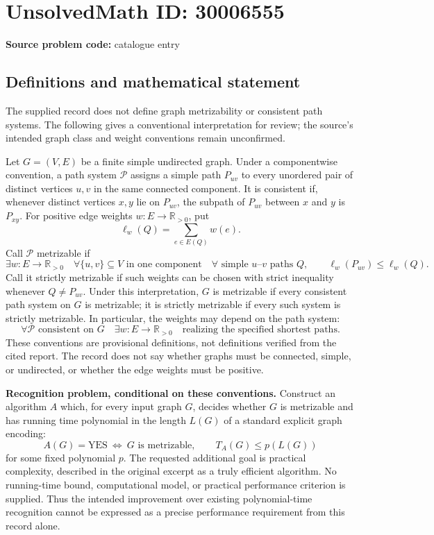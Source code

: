 \documentclass[11pt]{article}
\newcommand{\R}{\mathbb{R}}
\begin{document}
\section*{UnsolvedMath ID: 30006555}
\textbf{Source problem code:} catalogue entry
\subsection{Definitions and mathematical statement}
The supplied record does not define graph metrizability or consistent path systems. The following gives a conventional interpretation for review; the source's intended graph class and weight conventions remain unconfirmed.

Let \(G=(V,E)\) be a finite simple undirected graph. Under a componentwise convention, a path system \(\mathcal P\) assigns a simple path \(P_{uv}\) to every unordered pair of distinct vertices \(u,v\) in the same connected component. It is consistent if, whenever distinct vertices \(x,y\) lie on \(P_{uv}\), the subpath of \(P_{uv}\) between \(x\) and \(y\) is \(P_{xy}\). For positive edge weights \(w:E\to\R_{>0}\), put
\[
\ell_w(Q)=\sum_{e\in E(Q)}w(e).
\]
Call \(\mathcal P\) metrizable if
\[
\exists w:E\to\R_{>0}\quad
\forall \{u,v\}\subseteq V\text{ in one component}\quad
\forall\text{ simple }u\text{--}v\text{ paths }Q,
\qquad \ell_w(P_{uv})\leq\ell_w(Q).
\]
Call it strictly metrizable if such weights can be chosen with strict inequality whenever \(Q\ne P_{uv}\). Under this interpretation, \(G\) is metrizable if every consistent path system on \(G\) is metrizable; it is strictly metrizable if every such system is strictly metrizable. In particular, the weights may depend on the path system:
\[
\forall\mathcal P\text{ consistent on }G\quad\exists w:E\to\R_{>0}
\quad\text{realizing the specified shortest paths.}
\]
These conventions are provisional definitions, not definitions verified from the cited report. The record does not say whether graphs must be connected, simple, or undirected, or whether the edge weights must be positive.

\textbf{Recognition problem, conditional on these conventions.} Construct an algorithm \(A\) which, for every input graph \(G\), decides whether \(G\) is metrizable and has running time polynomial in the length \(L(G)\) of a standard explicit graph encoding:
\[
A(G)=\mathrm{YES}\ \Longleftrightarrow\ G\text{ is metrizable},
\qquad T_A(G)\leq p(L(G))
\]
for some fixed polynomial \(p\). The requested additional goal is practical complexity, described in the original excerpt as a truly efficient algorithm. No running-time bound, computational model, or practical performance criterion is supplied. Thus the intended improvement over existing polynomial-time recognition cannot be expressed as a precise performance requirement from this record alone.
\end{document}
